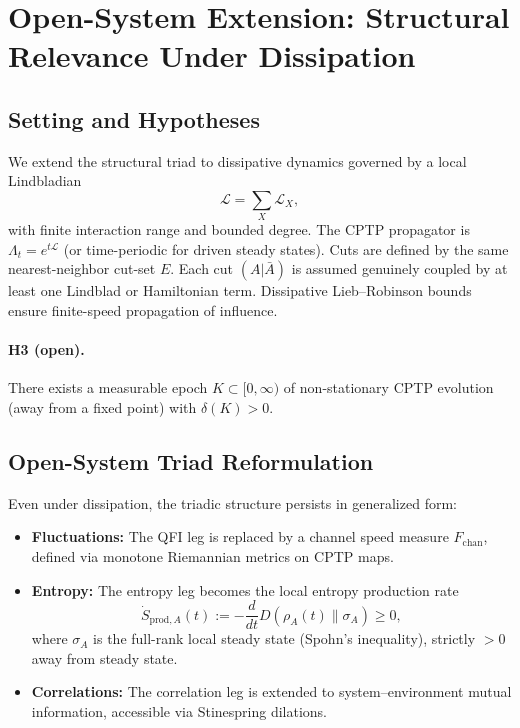 \documentclass[10pt]{article}
\begin{document}
\section{Open-System Extension: Structural Relevance Under Dissipation}

\subsection{Setting and Hypotheses}
We extend the structural triad to dissipative dynamics governed by a local Lindbladian
\[
\mathcal{L} = \sum_X \mathcal{L}_X,
\]
with finite interaction range and bounded degree. The CPTP propagator is
$\Lambda_t = e^{t\mathcal{L}}$ (or time-periodic for driven steady states).
Cuts are defined by the same nearest-neighbor cut-set $E$.
Each cut $(A|\bar{A})$ is assumed genuinely coupled by at least one Lindblad or Hamiltonian term.
Dissipative Lieb–Robinson bounds ensure finite-speed propagation of influence.

\paragraph{H3 (open).}
There exists a measurable epoch $K\subset[0,\infty)$ of non-stationary CPTP evolution (away from a fixed point) with $\delta(K)>0$.

\subsection{Open-System Triad Reformulation}
Even under dissipation, the triadic structure persists in generalized form:
\begin{itemize}
    \item \textbf{Fluctuations:} The QFI leg is replaced by a channel speed measure
    $F_{\mathrm{chan}}$, defined via monotone Riemannian metrics on CPTP maps.
    \item \textbf{Entropy:} The entropy leg becomes the local entropy production rate
    \[
    \dot{S}_{\mathrm{prod},A}(t) := -\frac{d}{dt} D(\rho_A(t)\|\sigma_A) \geq 0,
    \]
    where $\sigma_A$ is the full-rank local steady state (Spohn's inequality), strictly $>0$ away from steady state.
    \item \textbf{Correlations:} The correlation leg is extended to system–environment
    mutual information, accessible via Stinespring dilations.
\end{itemize}
\end{document}
